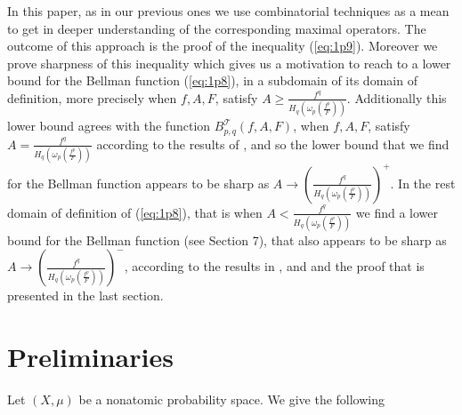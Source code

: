 \documentclass{article}
\numberwithin{equation}{section}
\theoremstyle{definition}
\theoremstyle{remark}
\newcommand{\mc}[1]{\mathcal{#1}}
\begin{document}
In this paper, as in our previous ones we use combinatorial techniques as a mean to get in deeper understanding of the corresponding maximal operators. The outcome of this approach is the proof of the inequality (\ref{eq:1p9}). Moreover we prove sharpness of this inequality which gives us a motivation to reach to a lower bound for the Bellman function (\ref{eq:1p8}), in a subdomain of its domain of definition, more precisely when $f,A,F$, satisfy $A \geq \frac{f^q}{H_q(\omega_p(\frac{f^p}{F}))}$. Additionally this lower bound agrees with the function $B_{p,q}^{\mc T}(f,A,F)$, when $f,A,F$, satisfy $A= \frac{f^q}{H_q(\omega_p(\frac{f^p}{F}))}$ according to the results of \cite{DN}, and so the lower bound that we find for the Bellman function appears to be sharp as $A\rightarrow (\frac{f^q}{H_q(\omega_p(\frac{f^p}{F}))})^+ $. In the rest domain of definition of (\ref{eq:1p8}), that is when $A < \frac{f^q}{H_q(\omega_p(\frac{f^p}{F}))}$ we find a lower bound for the Bellman function (see Section 7), that also appears to be sharp as $A\rightarrow (\frac{f^q}{H_q(\omega_p(\frac{f^p}{F}))})^- $, according to the results in \cite{DN}, \cite{N5} and\cite{NM} and the proof that is presented in the last section.   \\




\bigskip




\section{Preliminaries} \label{sec:2}
Let $(X,\mu)$ be a nonatomic probability space. We give the following
\end{document}
